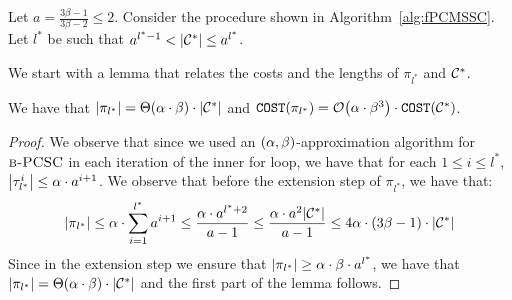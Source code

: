Let $a=\frac{3\beta-1}{3\beta-2}\leq 2$.
Consider the procedure shown in Algorithm~\ref{alg:fPCMSSC}.
Let $l^*$ be such that $a^{l^*-1} < \mathopen{}\left| \mathcal{C}^{*} \right| \leq a^{l^*}$.

We start with a lemma that relates the costs and the lengths of $\pi_{l^*}$ and $\mathcal{C}^{*}$.
    \begin{lemma}\label{lem:pi-spread-cost}
        We have that $\mathopen{}\left| \pi_{l^*} \right| = \Theta\mathopen{}\left( \alpha \cdot \beta \right)\cdot \mathopen{}\left| \mathcal{C}^{*} \right|$ and $\texttt{COST}\mathopen{}\left( \pi_{l^*} \right) = \mathcal{O}\mathopen{}\left( \alpha\cdot\beta^3 \right)\cdot \texttt{COST}\mathopen{}\left( \mathcal{C}^{*} \right)$.
    \end{lemma}
    \begin{proof}
        We observe that since we used an $\mathopen{}\left( \alpha, \beta \right)$-approximation algorithm for $\textup{\textsc{b-PCSC}}$ in each iteration of the inner for loop, we have that for each $1\leq i\leq l^*$, $\mathopen{}\left| \tau_{l^*}^i \right| \leq \alpha \cdot a^{i+1}$. We observe that before the extension step of $\pi_{l^*}$, we have that:
        \begin{equation} \label{eq:pi}
        \mathopen{}\left| \pi_{l^*} \right| \leq \alpha\cdot \sum_{i=1}^{l^*} a^{i+1}\leq \frac{\alpha\cdot a^{l^*+2}}{a-1}\leq \frac{\alpha\cdot a^{2}\mathopen{}\left| \mathcal{C}^{*} \right|}{a-1}\leq4\alpha\cdot \mathopen{}\left( 3\beta-1 \right)\cdot\mathopen{}\left| \mathcal{C}^{*} \right|
        \end{equation}
        Since in the extension step we ensure that $\mathopen{}\left| \pi_{l^*} \right| \geq \alpha\cdot \beta\cdot a^{l^*}$, we have that $\mathopen{}\left| \pi_{l^*} \right| = \Theta\mathopen{}\left( \alpha \cdot \beta \right)\cdot \mathopen{}\left| \mathcal{C}^{*} \right|$ and the first part of the lemma follows.


\end{proof}

